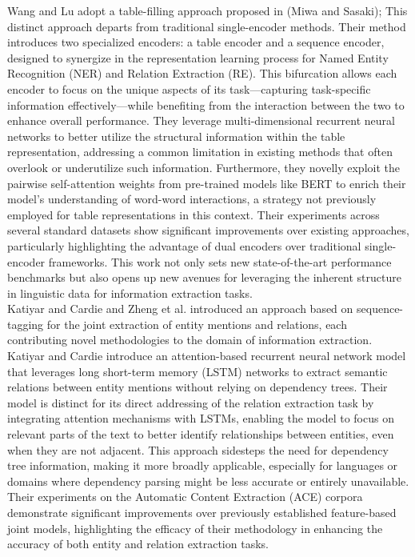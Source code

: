 Wang and Lu\cite{wang-lu-2020-two} adopt a table-filling approach proposed in (Miwa and Sasaki\cite{miwa-sasaki-2014-modeling});
This distinct approach departs from traditional single-encoder methods. Their method introduces two specialized encoders: a table encoder and a sequence encoder, designed to synergize in the representation learning process for Named Entity Recognition (NER) and Relation Extraction (RE). This bifurcation allows each encoder to focus on the unique aspects of its task—capturing task-specific information effectively—while benefiting from the interaction between the two to enhance overall performance. They leverage multi-dimensional recurrent neural networks to better utilize the structural information within the table representation, addressing a common limitation in existing methods that often overlook or underutilize such information. Furthermore, they novelly exploit the pairwise self-attention weights from pre-trained models like BERT to enrich their model's understanding of word-word interactions, a strategy not previously employed for table representations in this context. Their experiments across several standard datasets show significant improvements over existing approaches, particularly highlighting the advantage of dual encoders over traditional single-encoder frameworks. This work not only sets new state-of-the-art performance benchmarks but also opens up new avenues for leveraging the inherent structure in linguistic data for information extraction tasks.\\

Katiyar and Cardie\cite{katiyar-cardie-2017-going} and Zheng et al.\cite{zheng-etal-2017-joint} introduced an approach based on sequence-tagging for the joint extraction of entity mentions and relations, each contributing novel methodologies to the domain of information extraction. Katiyar and Cardie introduce an attention-based recurrent neural network model that leverages long short-term memory (LSTM) networks to extract semantic relations between entity mentions without relying on dependency trees. Their model is distinct for its direct addressing of the relation extraction task by integrating attention mechanisms with LSTMs, enabling the model to focus on relevant parts of the text to better identify relationships between entities, even when they are not adjacent. This approach sidesteps the need for dependency tree information, making it more broadly applicable, especially for languages or domains where dependency parsing might be less accurate or entirely unavailable. Their experiments on the Automatic Content Extraction (ACE) corpora demonstrate significant improvements over previously established feature-based joint models, highlighting the efficacy of their methodology in enhancing the accuracy of both entity and relation extraction tasks.

